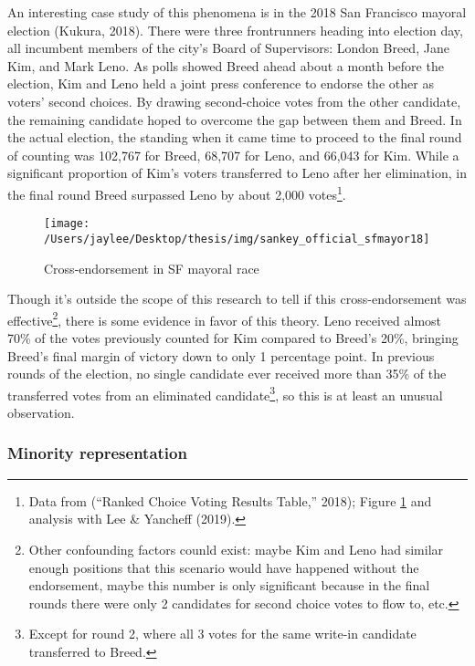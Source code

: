 \documentclass[12pt,twoside]{reedthesis}
\begin{document}
An interesting case study of this phenomena is in the 2018 San Francisco mayoral election (Kukura, 2018). There were three frontrunners heading into election day, all incumbent members of the city's Board of Supervisors: London Breed, Jane Kim, and Mark Leno. As polls showed Breed ahead about a month before the election, Kim and Leno held a joint press conference to endorse the other as voters' second choices. By drawing second-choice votes from the other candidate, the remaining candidate hoped to overcome the gap between them and Breed. In the actual election, the standing when it came time to proceed to the final round of counting was 102,767 for Breed, 68,707 for Leno, and 66,043 for Kim. While a significant proportion of Kim's voters transferred to Leno after her elimination, in the final round Breed surpassed Leno by about 2,000 votes\footnote{Data from (``Ranked Choice Voting Results Table,'' 2018); Figure \ref{fig:sankey} and analysis with Lee \& Yancheff (2019).}.
\begin{figure}
\texttt{[image: /Users/jaylee/Desktop/thesis/img/sankey\_official\_sfmayor18]} \caption{Cross-endorsement in SF mayoral race}\label{fig:sankey}
\end{figure}
Though it's outside the scope of this research to tell if this cross-endorsement was effective\footnote{Other confounding factors counld exist: maybe Kim and Leno had similar enough positions that this scenario would have happened without the endorsement, maybe this number is only significant because in the final rounds there were only 2 candidates for second choice votes to flow to, etc.}, there is some evidence in favor of this theory. Leno received almost 70\% of the votes previously counted for Kim compared to Breed's 20\%, bringing Breed's final margin of victory down to only 1 percentage point. In previous rounds of the election, no single candidate ever received more than 35\% of the transferred votes from an eliminated candidate\footnote{Except for round 2, where all 3 votes for the same write-in candidate transferred to Breed.}, so this is at least an unusual observation.

\hypertarget{minority-representation}{%
\subsubsection{Minority representation}\label{minority-representation}}
\end{document}
